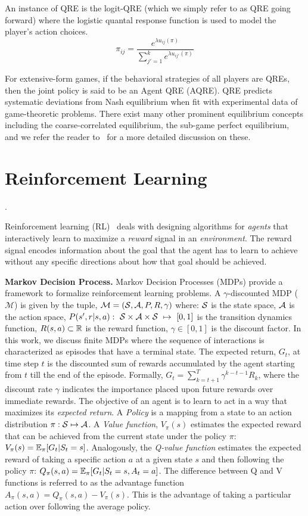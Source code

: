 An instance of QRE is the logit-QRE (which we simply refer to as QRE going forward) where the
logistic quantal response function is used to model the player's action choices.
$$ \pi_{ij} = \frac{e^{\lambda u_{ij}(\pi)}}{\sum_{j'=1}^k e^{\lambda u_{ij'}(\pi)}}$$

For extensive-form games, if the behavioral strategies of all players are QREs, then the joint
policy is said to be an Agent QRE (AQRE).
QRE predicts systematic deviations from Nash equilibrium when fit with experimental data of
game-theoretic problems.
There exist many other prominent equilibrium concepts including the coarse-correlated equilibrium,
the sub-game perfect equilibrium, and we refer the reader
to~\cite{shohamMultiagent2008,osborneintroduction2004} for a more detailed discussion on these.

\section{Reinforcement
  Learning}
.

Reinforcement learning (RL)~\cite{suttonReinforcement2018} deals with designing algorithms for
\textit{agents} that interactively learn to maximize a \textit{reward} signal in an
\textit{environment}.
The reward signal encodes information about the goal that the agent has to learn to achieve without
any specific directions about how that goal should be achieved.

\textbf{Markov Decision Process.}
Markov Decision Processes (MDPs) provide a framework to formalize reinforcement learning problems.
A $\gamma$-discounted MDP ($\mathcal{M}$) is given by the tuple, $\mathcal{M}=(\mathcal{S}, \mathcal{A}, P, R,
	\gamma)$ where: $\mathcal{S}$ is the state space, $\mathcal{A}$ is the action space,
$P(s',r|s,a):~\mathcal{S}\times\mathcal{A}\times\mathcal{S}~\mapsto~[0,1]$ is the transition dynamics function,
$R(s,a) \subset \mathbb{R}$ is the reward function, $\gamma \in [0,1]$ is the discount factor.
In this work, we discuss finite MDPs where the sequence of interactions is characterized as
episodes that have a terminal state.
The expected return, $G_t$, at time step $t$ is the discounted sum of rewards accumulated by the
agent starting from $t$ till the end of the episode.
Formally, $G_t = \sum_{k=t+1}^{T} \gamma^{k-t-1} R_k$, where the discount rate $\gamma$ indicates
the importance placed upon future rewards over immediate rewards.
The objective of an agent is to learn to act in a way that maximizes its \textit{expected return}.
A \textit{Policy} is a mapping from a state to an action distribution $\pi: \mathcal{S} \mapsto \mathcal{A}$.
A \textit{Value function}, $V_{\pi}(s)$ estimates the expected reward that can be achieved from the
current state under the policy $\pi$: $V_{\pi}(s) = \mathbb{E}_{\pi}[G_t | S_t = s]$.
Analogously, the \textit{Q-value function} estimates the expected reward of taking a specific
action $a$ at a given state $s$ and then following the policy $\pi$: $ Q_{\pi}(s, a) = \mathbb{E}_{\pi}[G_t
		| S_t = s, A_t = a] $.
The difference between Q and V functions is referred to as the advantage function $A_\pi(s,a) =
	Q_\pi(s,a) - V_\pi(s)$.
This is the advantage of taking a particular action over following the average policy.

